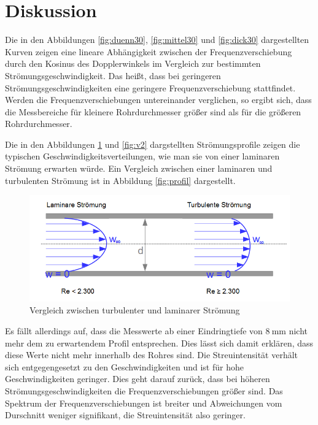 \section{Diskussion}
\label{sec:Diskussion}

Die in den Abbildungen \ref{fig:duenn30}, \ref{fig:mittel30} und \ref{fig:dick30} dargestellten Kurven zeigen eine lineare Abhängigkeit zwischen der Frequenzverschiebung durch den Kosinus des Dopplerwinkels im Vergleich zur bestimmten Strömungsgeschwindigkeit.
Das heißt, dass bei geringeren Strömungsgeschwindigkeiten eine geringere Frequenzverschiebung stattfindet.
Werden die Frequenzverschiebungen untereinander verglichen, so ergibt sich, dass die Messbereiche für kleinere Rohrdurchmesser größer sind als für die größeren Rohrdurchmesser.

Die in den Abbildungen \ref{fig:v1} und \ref{fig:v2} dargstellten Strömungsprofile zeigen die typischen Geschwindigkeitsverteilungen, wie man sie von einer laminaren Strömung erwarten würde.
Ein Vergleich zwischen einer laminaren und turbulenten Strömung ist in Abbildung \ref{fig:profil} dargestellt.

\begin{figure}
  \centering
  \includegraphics[width=\textwidth]{images/Stroemungsprofil.png}
  \caption{Vergleich zwischen turbulenter und laminarer Strömung \cite{profil}}
  \label{fig:v1}
\end{figure}

Es fällt allerdings auf, dass die Messwerte ab einer Eindringtiefe von $\SI{8}{\milli\metre}$ nicht mehr dem zu erwartendem Profil entsprechen.
Dies lässt sich damit erklären, dass diese Werte nicht mehr innerhalb des Rohres sind.
Die Streuintensität verhält sich entgegengesetzt zu den Geschwindigkeiten und ist für hohe Geschwindigkeiten geringer.
Dies geht darauf zurück, dass bei höheren Strömungsgeschwindigkeiten die Frequenzverschiebungen größer sind.
Das Spektrum der Frequenzverschiebungen ist breiter und Abweichungen vom Durschnitt weniger signifikant, die Streuintensität also geringer.
